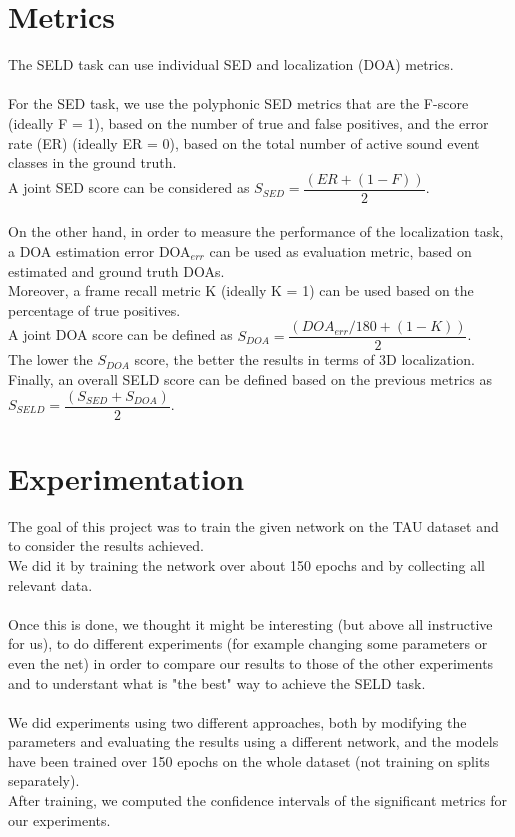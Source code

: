 \documentclass{article}
\begin{document}
    \section{Metrics}
    The SELD task can use individual SED and localization (DOA) metrics.
    \\ \\ For the SED task, we use the polyphonic SED metrics that are the F-score (ideally F = 1), based on the number of true and 
    false positives, and the error rate (ER) (ideally ER = 0), based on the total number of active sound event classes in the ground 
    truth.\\
    A joint SED score can be considered as $S_{SED} = \dfrac{(ER+(1-F))}{2}$.
    \\ \\ On the other hand, in order to measure the performance of the localization task, a DOA estimation error DOA$_{err}$ can be 
    used as evaluation metric, based on estimated and ground truth DOAs.\\ Moreover, a frame recall metric K (ideally K = 1) can be 
    used based on the percentage of true positives. \\
    A joint DOA score can be defined as $S_{DOA} = \dfrac{(DOA_{err}/180 + (1 - K))}{2}$.\\
    The lower the $S_{DOA}$ score, the better the results in terms of 3D localization.
    Finally, an overall SELD score can be defined based on the previous metrics as $S_{SELD} = \dfrac{(S_{SED} + S_{DOA})}{2}$.
    \section{Experimentation}
    The goal of this project was to train the given network on the TAU dataset and to consider the results achieved.\\
    We did it by training the network over about 150 epochs and by collecting all relevant data.\\
    \\
    Once this is done, we thought it might be interesting (but above all instructive for us), to do different experiments (for example changing some parameters or even the net) in order to compare our results to those of the other experiments and to understant what is "the best" way to achieve the SELD task.\\
    \\ 
    We did experiments using two different approaches, both by modifying the parameters and evaluating the results using a different 
    network, and the models have been trained over 150 epochs on the whole dataset (not training on splits separately).\\
    After training, we computed the confidence intervals of the significant metrics for our experiments.
\end{document}
